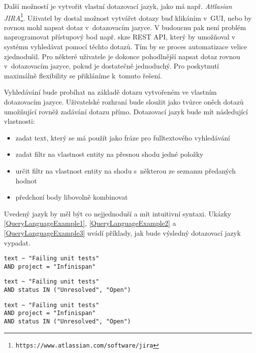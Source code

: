 \documentclass[11pt,oneside]{fithesis2}
\begin{document}
Další možností je vytvořit vlastní dotazovací jazyk, jako má např. \emph{Attlasian JIRA}\footnote{\texttt{https://www.atlassian.com/software/jira}}. Uživatel by dostal možnost vytvářet dotazy buď klikáním v~GUI, nebo by rovnou mohl napsat dotaz v~dotazovacím jazyce. V budoucnu pak není problém naprogramovat přístupový bod např. skze REST API, který by umožňoval v systému vyhledávat pomocí těchto dotazů. Tím by se proces automatizace velice zjednodušil. Pro některé uživatele je dokonce pohodlnější napsat dotaz rovnou v~dotazovacím jazyce, pokud je dostatečně jednoduchý. Pro poskytnutí maximálně flexibility se přikláníme k~tomuto řešení.

Vyhledávání bude probíhat na základě dotazu vytvořeném ve vlastním dotazovacím jazyce. Uživatelské rozhraní bude sloužit jako tvůrce oněch dotazů umožňující rovněž zadávání dotazu přímo. Dotazovací jazyk bude mít následující vlastnosti:
\begin{itemize}
	\item zadat text, který se má použít jako fráze pro fulltextového vyhledávání
	\item zadat filtr na vlastnost entity na přesnou shodu jedné položky
	\item určit filtr na vlastnost entity na shodu s~některou ze seznamu předaných hodnot
	\item předchozí body libovolně kombinovat
\end{itemize}

Uvedený jazyk by měl být co nejjednoduší a mít intuitivní syntaxi. Ukázky \ref{QueryLanguageExample1}, \ref{QueryLanguageExample2} a \ref{QueryLanguageExample3} uvádí příklady, jak bude výsledný dotazovací jazyk vypadat.

\begin{lstlisting}[caption =  Vyhledání fráze {\uv{Failing unit tests}} pouze u projektu {\uv{Infinispan}}, label = QueryLanguageExample1]
text ~ "Failing unit tests"
AND project = "Infinispan"
\end{lstlisting}

\begin{lstlisting}[caption =  Vyhledání fráze {\uv{Failing unit tests}} u požadavků se statusem {\uv{Unresolved}} nebo \uv{Open}, label = QueryLanguageExample2]
text ~ "Failing unit tests" 
AND status IN ("Unresolved", "Open")
\end{lstlisting}

\begin{lstlisting}[caption =  Kombinace dotazů {\ref{QueryLanguageExample1}} a {\ref{QueryLanguageExample2}}, label = QueryLanguageExample3]
text ~ "Failing unit tests" 
AND project = "Infinispan" 
AND status IN ("Unresolved", "Open")
\end{lstlisting}
\end{document}
